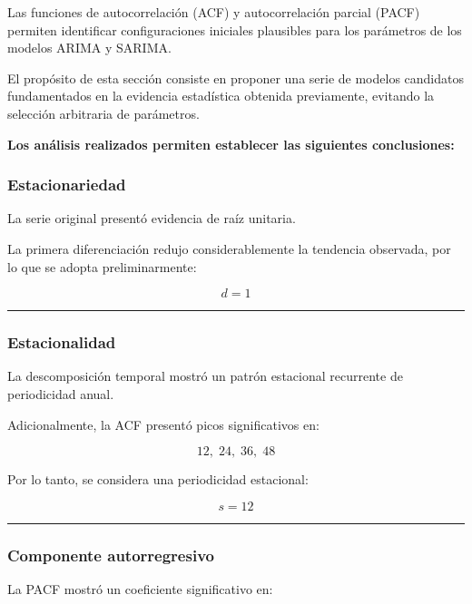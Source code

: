 \documentclass[11pt]{article}
\begin{document}
Las funciones de autocorrelación (ACF) y autocorrelación parcial (PACF)
permiten identificar configuraciones iniciales plausibles para los
parámetros de los modelos ARIMA y SARIMA.

El propósito de esta sección consiste en proponer una serie de modelos
candidatos fundamentados en la evidencia estadística obtenida
previamente, evitando la selección arbitraria de parámetros.

\textbf{Los análisis realizados permiten establecer las siguientes
conclusiones:}

\hypertarget{estacionariedad}{%
\subsubsection{Estacionariedad}\label{estacionariedad}}

La serie original presentó evidencia de raíz unitaria.

La primera diferenciación redujo considerablemente la tendencia
observada, por lo que se adopta preliminarmente:

\[
d = 1
\]

\begin{center}\rule{0.5\linewidth}{0.5pt}\end{center}

\hypertarget{estacionalidad}{%
\subsubsection{Estacionalidad}\label{estacionalidad}}

La descomposición temporal mostró un patrón estacional recurrente de
periodicidad anual.

Adicionalmente, la ACF presentó picos significativos en:

\[
12,\;24,\;36,\;48
\]

Por lo tanto, se considera una periodicidad estacional:

\[
s = 12
\]

\begin{center}\rule{0.5\linewidth}{0.5pt}\end{center}

\hypertarget{componente-autorregresivo}{%
\subsubsection{Componente
autorregresivo}\label{componente-autorregresivo}}

La PACF mostró un coeficiente significativo en:
\end{document}
